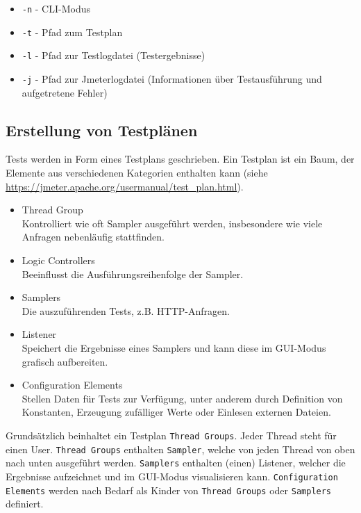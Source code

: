 \begin{itemize}
    \item \texttt{-n} - CLI-Modus
    \item \texttt{-t} - Pfad zum Testplan
    \item \texttt{-l} - Pfad zur Testlogdatei (Testergebnisse)
    \item \texttt{-j} - Pfad zur Jmeterlogdatei (Informationen über Testausführung und aufgetretene Fehler)
\end{itemize}

\subsection{Erstellung von Testplänen}

Tests werden in Form eines Testplans geschrieben.
Ein Testplan ist ein Baum, der Elemente aus verschiedenen Kategorien enthalten kann (siehe \url{https://jmeter.apache.org/usermanual/test_plan.html}).

\begin{itemize}
    \item Thread Group\hfill
          \\Kontrolliert wie oft Sampler ausgeführt werden, insbesondere wie viele Anfragen nebenläufig stattfinden.
    \item Logic Controllers\hfill
          \\Beeinflusst die Ausführungsreihenfolge der Sampler.
    \item Samplers\hfill
          \\Die auszuführenden Tests, z.B. HTTP-Anfragen.
    \item Listener\hfill
          \\Speichert die Ergebnisse eines Samplers und kann diese im GUI-Modus grafisch aufbereiten.
    \item Configuration Elements\hfill
          \\Stellen Daten für Tests zur Verfügung, unter anderem durch Definition von Konstanten, Erzeugung zufälliger Werte oder Einlesen externen Dateien.
\end{itemize}

Grundsätzlich beinhaltet ein Testplan \texttt{Thread Groups}.
Jeder Thread steht für einen User.
\texttt{Thread Groups} enthalten \texttt{Sampler}, welche von jeden Thread von oben nach unten ausgeführt werden.
\texttt{Samplers} enthalten (einen) Listener, welcher die Ergebnisse aufzeichnet und im GUI-Modus visualisieren kann.
\texttt{Configuration Elements} werden nach Bedarf als Kinder von \texttt{Thread Groups} oder \texttt{Samplers} definiert.


